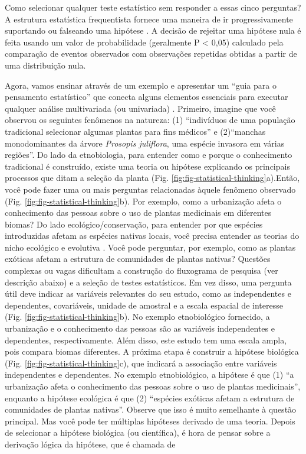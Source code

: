 \documentclass[
]{book}
\begin{document}
Como selecionar qualquer teste estatístico sem responder a essas cinco perguntas? A estrutura estatística frequentista fornece uma maneira de ir progressivamente suportando ou falseando uma hipótese \citep{neyman__problem_1933, popper_logic_1959}. A decisão de rejeitar uma hipótese nula é feita usando um valor de probabilidade (geralmente P \textless{} 0,05) calculado pela comparação de eventos observados com observações repetidas obtidas a partir de uma distribuição nula.

Agora, vamos ensinar através de um exemplo e apresentar um ``guia para o pensamento estatístico'' que conecta alguns elementos essenciais para executar qualquer análise multivariada (ou univariada) \citep[Fig. \ref{fig:fig-statistical-thinking}, veja também a Fig. 1.3 em][ e Fig. 1 em \citet{underwood_experiments_1997}]{legendre_numerical_2012}. Primeiro, imagine que você observou os seguintes fenômenos na natureza: (1) ``indivíduos de uma população tradicional selecionar algumas plantas para fins médicos'' e (2)``manchas monodominantes da árvore \emph{Prosopis juliflora}, uma espécie invasora em várias regiões''. Do lado da etnobiologia, para entender como e porque o conhecimento tradicional é construído, existe uma teoria ou hipótese \citep[por exemplo, hipótese de aparência:][]{goncalves_most_2016} explicando os principais processos que ditam a seleção da planta (Fig. \ref{fig:fig-statistical-thinking}a).Então, você pode fazer uma ou mais perguntas relacionadas àquele fenômeno observado (Fig. \ref{fig:fig-statistical-thinking}b). Por exemplo, como a urbanização afeta o conhecimento das pessoas sobre o uso de plantas medicinais em diferentes biomas? Do lado ecológico/conservação, para entender por que espécies introduzidas afetam as espécies nativas locais, você precisa entender as teorias do nicho ecológico e evolutiva \citep{macdougall_plant_2009, saul_eco-evolutionary_2015}. Você pode perguntar, por exemplo, como as plantas exóticas afetam a estrutura de comunidades de plantas nativas? Questões complexas ou vagas dificultam a construção do fluxograma de pesquisa (ver descrição abaixo) e a seleção de testes estatísticos. Em vez disso, uma pergunta útil deve indicar as variáveis relevantes do seu estudo, como as independentes e dependentes, covariáveis, unidade de amostral e a escala espacial de interesse (Fig. \ref{fig:fig-statistical-thinking}b). No exemplo etnobiológico fornecido, a urbanização e o conhecimento das pessoas são as variáveis independentes e dependentes, respectivamente. Além disso, este estudo tem uma escala ampla, pois compara biomas diferentes. A próxima etapa é construir a hipótese biológica (Fig. \ref{fig:fig-statistical-thinking}c), que indicará a associação entre variáveis independentes e dependentes. No exemplo etnobiológico, a hipótese é que (1) ``a urbanização afeta o conhecimento das pessoas sobre o uso de plantas medicinais'', enquanto a hipótese ecológica é que (2) ``espécies exóticas afetam a estrutura de comunidades de plantas nativas''. Observe que isso é muito semelhante à questão principal. Mas você pode ter múltiplas hipóteses \citep{platt_strong_1964} derivado de uma teoria. Depois de selecionar a hipótese biológica (ou científica), é hora de pensar sobre a derivação lógica da hipótese, que é chamada de 
\end{document}
